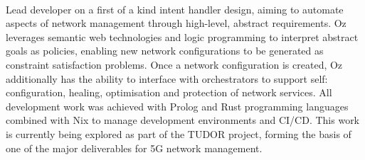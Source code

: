 \documentclass[9pt]{developercv} %
\begin{document}
\begin{minipage}[t]{0.6\textwidth}
	\vspace{-\baselineskip} %
	\\
	Lead developer on a first of a kind intent handler design, aiming to
	automate aspects of network management through high-level, abstract
	requirements. Oz leverages semantic web technologies and logic programming
	to interpret abstract goals as policies, enabling new network configurations
	to be generated as constraint satisfaction problems. Once a network
	configuration is created, Oz additionally has the ability to interface with
	orchestrators to support self: configuration, healing, optimisation and
	protection of network services. All development work was achieved with
	Prolog and Rust programming languages combined with Nix to manage
	development environments and CI/CD. This work is currently being explored as
	part of the TUDOR project, forming the basis of one of the major
	deliverables for 5G network management.
\end{minipage}

\end{document}

